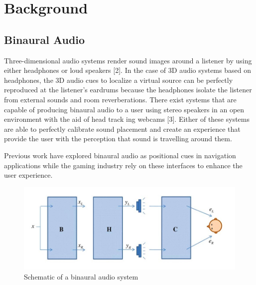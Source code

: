 \newpage                                                   \chapter{Background}

\section{                  Binaural Audio                                     }

Three-dimensional audio systems render sound images around a listener by using
either headphones or loud speakers [2]. In the case of 3D audio systems based
on headphones, the 3D audio cues to localize a virtual source can be perfectly
reproduced at the listener’s eardrums because the headphones isolate the
listener from external sounds and room reverberations.  There exist systems that
are capable of producing binaural audio to a user using stereo speakers in an
open environment with the aid of head track ing webcams [3]. Either of these
systems are able to perfectly calibrate sound placement and create an
experience that provide the user with the perception that sound is travelling
around them.


Previous work  have explored binaural audio as positional cues in navigation
applications while the gaming industry rely on these interfaces to enhance the
user experience.


\begin{figure}[h]
  \centering
  \includegraphics[width=1\textwidth]{images/binaural_diagram.jpg}
  \caption{Schematic of a binaural audio system}
\end{figure}



